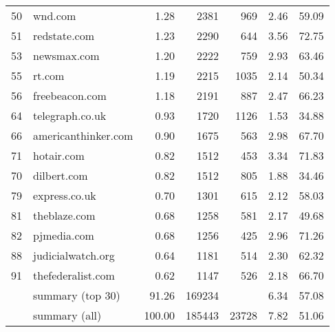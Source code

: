 \begin{tabular}{llrrrrr}
50               &                       wnd.com &    1.28 &    2381 &     969 &         2.46 &         59.09 \\
51               &                  redstate.com &    1.23 &    2290 &     644 &         3.56 &         72.75 \\
53               &                   newsmax.com &    1.20 &    2222 &     759 &         2.93 &         63.46 \\
55               &                        rt.com &    1.19 &    2215 &    1035 &         2.14 &         50.34 \\
56               &                freebeacon.com &    1.18 &    2191 &     887 &         2.47 &         66.23 \\
64               &               telegraph.co.uk &    0.93 &    1720 &    1126 &         1.53 &         34.88 \\
66               &           americanthinker.com &    0.90 &    1675 &     563 &         2.98 &         67.70 \\
71               &                    hotair.com &    0.82 &    1512 &     453 &         3.34 &         71.83 \\
70               &                   dilbert.com &    0.82 &    1512 &     805 &         1.88 &         34.46 \\
79               &                 express.co.uk &    0.70 &    1301 &     615 &         2.12 &         58.03 \\
81               &                  theblaze.com &    0.68 &    1258 &     581 &         2.17 &         49.68 \\
82               &                   pjmedia.com &    0.68 &    1256 &     425 &         2.96 &         71.26 \\
88               &             judicialwatch.org &    0.64 &    1181 &     514 &         2.30 &         62.32 \\
91               &             thefederalist.com &    0.62 &    1147 &     526 &         2.18 &         66.70 \\
& summary (top 30) & 91.26 &  169234 &         &         6.34 &         57.08 \\
& summary (all)    & 100.00 &  185443 &  23728 &         7.82 &         51.06 \\
\bottomrule
\end{tabular}
